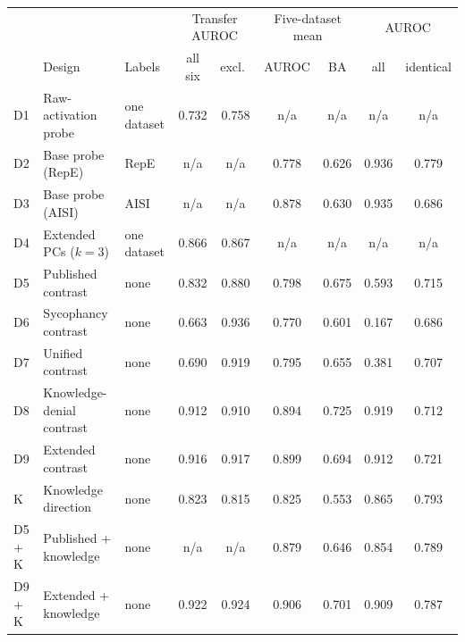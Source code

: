 \begin{tabular}{@{}l l l cc cc cc@{}}
\toprule
 & & & \multicolumn{2}{c}{Transfer AUROC} & \multicolumn{2}{c}{Five-dataset mean} & \multicolumn{2}{c}{\hpkr{} AUROC} \\
\cmidrule(lr){4-5}\cmidrule(lr){6-7}\cmidrule(lr){8-9}
 & Design & Labels & all six & excl.\ \hpkr{} & AUROC & BA & all & identical \\
\midrule
D1 & Raw-activation probe & one dataset & 0.732 & 0.758 & n/a & n/a & n/a & n/a \\
D2 & Base probe (RepE) & RepE & n/a & n/a & 0.778 & 0.626 & 0.936 & 0.779 \\
D3 & Base probe (AISI) & AISI & n/a & n/a & 0.878 & 0.630 & 0.935 & 0.686 \\
D4 & Extended PCs ($k=3$) & one dataset & 0.866 & 0.867 & n/a & n/a & n/a & n/a \\
D5 & Published contrast & none & 0.832 & 0.880 & 0.798 & 0.675 & 0.593 & 0.715 \\
D6 & Sycophancy contrast & none & 0.663 & 0.936 & 0.770 & 0.601 & 0.167 & 0.686 \\
D7 & Unified contrast & none & 0.690 & 0.919 & 0.795 & 0.655 & 0.381 & 0.707 \\
D8 & Knowledge-denial contrast & none & 0.912 & 0.910 & 0.894 & 0.725 & 0.919 & 0.712 \\
D9 & Extended contrast & none & 0.916 & 0.917 & 0.899 & 0.694 & 0.912 & 0.721 \\
\midrule
K & Knowledge direction & none & 0.823 & 0.815 & 0.825 & 0.553 & 0.865 & 0.793 \\
D5 + K & Published + knowledge & none & n/a & n/a & 0.879 & 0.646 & 0.854 & 0.789 \\
D9 + K & Extended + knowledge & none & 0.922 & 0.924 & 0.906 & 0.701 & 0.909 & 0.787 \\
\bottomrule
\end{tabular}
